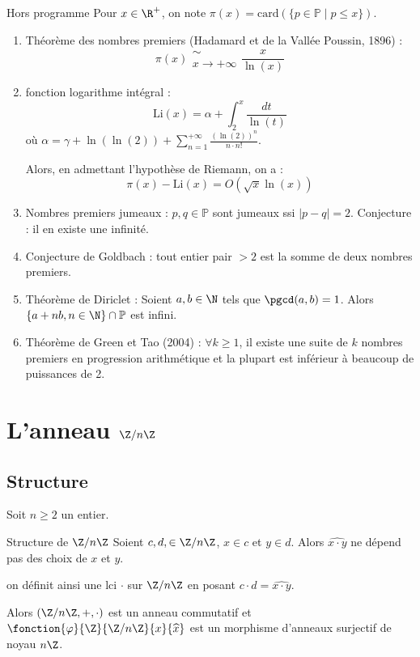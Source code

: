 \begin{proposition}{Hors programme}{}
    Pour $x \in \R^+$, on note $\pi(x) = \text{card}(\{p \in \mathbb{P} \mid p \leqslant x\})$.

    \begin{enumerate}
        \item Théorème des nombres premiers (Hadamard et de la Vallée Poussin, 1896) :
        $$\displaystyle \pi(x) \substack{\sim \\ x \to + \infty} \frac x {\ln(x)}$$
        \item fonction logarithme intégral : 
        $$\displaystyle \mathrm{Li}(x) = \alpha + \int_2^x \frac {dt}{\ln(t)}$$ 
        où $\displaystyle \alpha = \gamma + \ln(\ln(2)) + \sum_{n = 1}^{+\infty} \frac{(\ln(2))^n}{n \cdot n!}$. 

        Alors, en admettant l'hypothèse de Riemann, on a : 
        $$\displaystyle \pi(x)  - \mathrm{Li}(x) = O(\sqrt x \ln(x))$$
        \item Nombres premiers jumeaux : $p, q \in \mathbb P$ sont jumeaux ssi $|p - q| = 2$. 
        Conjecture : il en existe une infinité. 
        \item Conjecture de Goldbach : tout entier pair $> 2$ est la somme de deux nombres premiers.
    
        \item Théorème de Diriclet : Soient $a, b \in \N$ tels que $\pgcd(a, b) = 1$. Alors 
        $\{a + nb, n \in \N\} \cap \mathbb P$ est infini.
        \item Théorème de Green et Tao (2004) : $\forall k \geqslant 1$, il existe une suite de $k$ nombres premiers 
        en progression arithmétique et la plupart est inférieur à beaucoup de puissances de 2.
    \end{enumerate}
     
\end{proposition}

\section{L'anneau \texorpdfstring{$\Z / n \Z$}{Z/nZ}}
\subsection{Structure}

Soit $n \geqslant 2$ un entier.

\begin{theoreme}{Structure de $\Z / n \Z$}{}
    Soient $c, d, \in \Z/ n \Z$, $x \in c $ et $y \in d$. Alors 
    $\widehat{x \cdot y}$ ne dépend pas des choix de $x$ et $y$.

    on définit ainsi une lci $\cdot$ sur $\Z / n \Z$  en posant $c \cdot d = \widehat{x \cdot y}$.

    Alors $(\Z / n \Z, +, \cdot)$ est un anneau commutatif et $\fonction{\varphi}{\Z}{\Z / n \Z}{x}{\widehat x}$ est un morphisme d'anneaux
    surjectif de noyau $n \Z$.
\end{theoreme}


